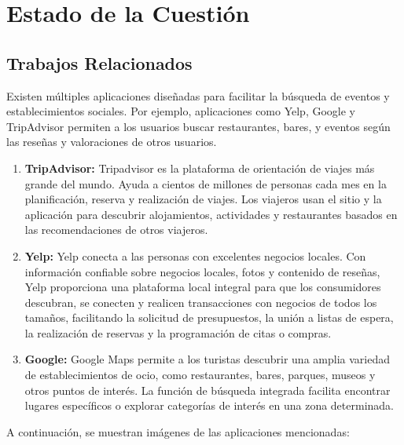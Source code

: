 \chapter{Estado de la Cuestión}
\section{Trabajos Relacionados}

Existen múltiples aplicaciones diseñadas para facilitar la búsqueda de eventos y establecimientos sociales. Por
ejemplo, aplicaciones como Yelp, Google y TripAdvisor permiten a los usuarios buscar restaurantes, bares, y eventos
según las reseñas y valoraciones de otros usuarios.

\begin{enumerate}
    \item \textbf{TripAdvisor:} Tripadvisor es la plataforma de orientación de viajes más grande del mundo. Ayuda a
          cientos de millones de personas cada mes en la planificación, reserva y realización de viajes. Los viajeros usan
          el sitio y la aplicación para descubrir alojamientos, actividades y restaurantes basados en las recomendaciones
          de otros viajeros.

    \item \textbf{Yelp:} Yelp conecta a las personas con excelentes negocios locales. Con información confiable
          sobre negocios locales, fotos y contenido de reseñas, Yelp proporciona una plataforma local integral para que
          los consumidores descubran, se conecten y realicen transacciones con negocios de todos los tamaños, facilitando
          la solicitud de presupuestos, la unión a listas de espera, la realización de reservas y la programación de citas
          o compras.

    \item \textbf{Google:} Google Maps permite a los turistas descubrir una amplia variedad de establecimientos de
          ocio, como restaurantes, bares, parques, museos y otros puntos de interés. La función de búsqueda integrada
          facilita encontrar lugares específicos o explorar categorías de interés en una zona determinada.

\end{enumerate}

A continuación, se muestran imágenes de las aplicaciones mencionadas:

